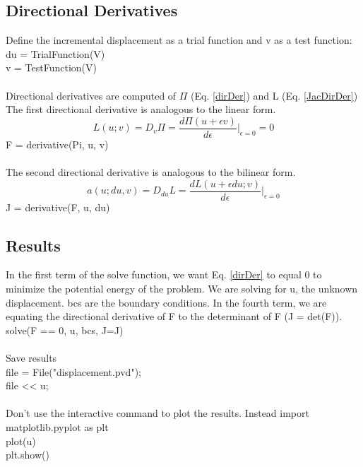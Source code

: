 \documentclass[12pt,3p]{article}
\begin{document}
\subsection{Directional Derivatives}
Define the incremental displacement as a trial function and v as a test function: \\
{\selectfont
du = TrialFunction(V) \\          
v  = TestFunction(V) \\ \\
}
Directional derivatives are computed of $\Pi$ (Eq. \ref{dirDer}) and L (Eq. \ref{JacDirDer}) \\ 
The first directional derivative is analogous to the linear form.
\begin{equation*}
L(u;v) = D_v \Pi = \frac{d \Pi (u + \epsilon v)}{d \epsilon} \Bigr\rvert_{\epsilon = 0} = 0 
\end{equation*}
{\selectfont
F = derivative(Pi, u, v) \\ \\
}
The second directional derivative is analogous to the bilinear form. 
\begin{equation*}
a(u;du,v) = D_{du} L = \frac{dL(u+ \epsilon du; v)}{d \epsilon} \Bigr\rvert_{\epsilon = 0}
\end{equation*}
{\selectfont
J = derivative(F, u, du) 
}

\subsection{Results}
In the first term of the solve function, we want Eq. \ref{dirDer} to equal 0 to minimize the potential energy of the problem. We are solving for {\selectfont u}, the unknown displacement. {\selectfont bcs} are the boundary conditions. In the fourth term, we are equating the directional derivative of F to the determinant of F (J = det(F)). \\
{\selectfont
solve(F == 0, u, bcs, J=J) \\ \\ 
}
Save results \\
{\selectfont
file = File("displacement.pvd"); \\
file << u; \\ \\
}
Don't use the {\selectfont interactive} command to plot the results. Instead import {\selectfont matplotlib.pyplot} as {\selectfont plt} \\
{\selectfont
plot(u) \\
plt.show() \\
}
\end{document}
